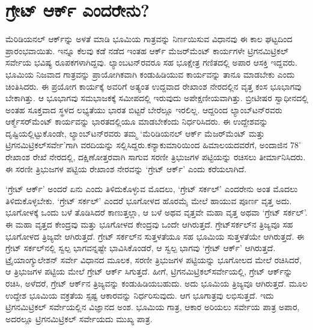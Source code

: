 
\chapter{ಗ್ರೇಟ್​ ಆರ್ಕ್ ಎಂದರೇನು?}

ಮೆರಿಡಿಯನಲ್​ ಆರ್ಕ್‌ನ್ನು ಅಳತೆ ಮಾಡಿ ಭೂಮಿಯ ಗಾತ್ರವನ್ನು ನಿರ್ಣಯಿಸುವ ವಿಧಾನವು ಈ ಕಾಲ ಘಟ್ಟದಿಂದ ಪ್ರಾರಂಭವಾಯಿತು. ಇನ್ನೂ ಕೆಲವು ಕಡೆ ನಡೆದ ಇಂತಹ ಆರ್ಕ್ ಮೆಜರ್​ಮೆಂಟ್​ ಕಾರ್ಯಗಳೇ ಟ್ರಿಗನಮಿಟ್ರಿಕಲ್​ ಸರ್ವೇಯ ಭವಿಷ್ಯ ರೂಪಕಗಳಾಗಿದ್ದವು. ಲ್ಯಾಂಬಟನ್​ರವರೂ ಸಹ ಭೂಕ್ಷೇತ್ರ ಗಣಿತದಲ್ಲಿ ಅಪಾರ ಆಸಕ್ತಿ ಇದ್ದವರು. ಭೂಮಿಯ ನಿಜವಾದ ಗಾತ್ರವನ್ನು ಪ್ರಾಯೋಗಿಕವಾಗಿ ಕಂಡುಹಿಡಿಯುವ ಕಾರ್ಯವನ್ನು ತಾನೂ ಮಾಡಬೇಕು ಎಂದು ಚಿಂತಿಸಿದರು. ಈ ಪ್ರಯೋಗ ಕಾರ್ಯಕ್ಕೆ ಅವರಿಗೆ ಅತ್ಯಂತ ಉದ್ದವಾದ ರೇಖಾಂಶ ನೇರದಲ್ಲಿನ ವೃತ್ತ ಕಂಸ ಭೂಭಾಗವು ಬೇಕಾಗಿತ್ತು. ಆ ಭೂಭಾಗವು ಸಮಭಾಜಕಕ್ಕೆ ಸಮೀಪದಲ್ಲಿ ಇರುವುದು ಅಪೇಕ್ಷಣೀಯವಾಗಿತ್ತು. ಬ್ರೀಟೀಷರ ಸ್ವಾಧೀನದಲ್ಲಿ ಅಂತಹ ಸೂಕ್ತವಾದ ಸ್ಥಳದ ಲಭ್ಯತೆಯು ಭಾರತ ಬಿಟ್ಟರೆ ಬೇರೆಲ್ಲೂ ಇರಲಿಲ್ಲ. ಆದ್ದರಿಂದ ಲ್ಯಾಂಬ್​ಟನ್​ರವರು ಆರ್ಕ್\break ಮೆಸರ್​ಮೆಂಟ್​ ಕಾರ್ಯವನ್ನು ಭಾರತದಲ್ಲಿಯೂ ಮಾಡಬೇಕೆಂದು ನಿರ್ಧರಿಸಿದರು. ಈ ಉದ್ದೇಶವನ್ನು ದೃಷ್ಟಿಯಲ್ಲಿಟ್ಟುಕೊಂಡೇ, ಲ್ಯಾಂಬ್​ಟನ್​ರವರು ತಮ್ಮ ‘ಮೆರಿಡಿಯನಲ್​ ಆರ್ಕ್ ಮೆಜರ್​ಮೆಂಟ್​ ಮತ್ತು ಟ್ರಿಗನಮಿಟ್ರಿಕಲ್​ ಸರ್ವೇ’ಗಾಗಿ ವರದಿಯನ್ನು ಸಲ್ಲಿಸಿದ್ದರು.\break ಕನ್ಯಾಕುಮಾರಿಯಿಂದ ಹಿಮಾಲಯದವರೆಗೆ, ಅಂದಾಜಿನ $78^\circ$ ರೇಖಾಂಶ ರೇಖೆ ನೇರದಲ್ಲಿ, ದಕ್ಷಿಣೋತ್ತರವಾಗಿ ಸಾಗುವ ಸರಣೀ ತ್ರಿಭುಜಗಳ ಪಟ್ಟಿಯನ್ನು ರಚಿಸಲು ತೀರ್ಮಾನಿಸಿದರು. ಈ ಸರಣೀ ತ್ರಿಭುಜಗಳ ಪಟ್ಟಿಯ ರೇಖಾಂಶ ನೇರವನ್ನು ‘ಗ್ರೇಟ್​ ಆರ್ಕ್’ ಎಂದು ಕರೆಯಲಾಗಿದೆ.

`ಗ್ರೇಟ್​ ಆರ್ಕ್’ ಅಂದರೆ ಏನು ಎಂದು ತಿಳಿದುಕೊಳ್ಳುವ ಮೊದಲು, ‘ಗ್ರೇಟ್​ ಸರ್ಕಲ್​’ ಎಂದರೇನು ಅಂತ ಮೊದಲು ತಿಳಿದುಕೊಳ್ಳಬೇಕು. ‘ಗ್ರೇಟ್​ ಸರ್ಕಲ್​’ ಎಂದರೆ ಭೂಗೋಳದ ಹೊರಮೈ ಮೇಲೆ ಹಾಯುವ ಪೂರ್ಣ ವೃತ್ತ ಅದು. ಭೂಗೋಳಕ್ಕೆ ಒಂದು ಬಳೆ ತೊಡಿಸಿದರೆ ಕಾಣುತ್ತಲ್ಲಾ, ಆ ಬಳೆ ಅಥವ ವೃತ್ತವೇ ಮಹಾ ವೃತ್ತ ಅಥವಾ ‘ಗ್ರೇಟ್​ ಸರ್ಕಲ್​’. ಈ ಮಹಾ ವೃತ್ತದ ಕೇಂದ್ರವು ಮತ್ತು ಭೂಗೋಳದ ಕೇಂದ್ರವು ಒಂದೇ ಆಗಿರುತ್ತದೆ. ಗ್ರೇಟ್​ ಸರ್ಕಲ್​ನ ತ್ರಿಜ್ಯವೂ ಸಹ ಭೂಗೋಳದ ತ್ರಿಜ್ಯವೇ ಆಗಿರುತ್ತದೆ. ಗ್ರೇಟ್​ ಸರ್ಕಲ್​ನ ಸುತ್ತಳತೆಯೂ ಸಹ ಭೂಮಿಯ ಸುತ್ತಳತೆಯೇ ಆಗಿರುತ್ತದೆ. ಈ ಗ್ರೇಟ್​ ಸರ್ಕಲ್​ನಲ್ಲಿ ಸ್ವಲ್ಪ ಭಾಗವನ್ನಷ್ಟೇ ಭಾವಿಸಿಕೊಂಡರೆ, ಆ ಸ್ವಲ್ಪ ಭಾಗವು ‘ಗ್ರೇಟ್​ ಆರ್ಕ್’ ಆಗಿರುತ್ತದೆ. ಟ್ರೈಯಾಂಗ್ಯುಲೇಶನ್​ ಸರ್ವೇ ವಿಧಾನದ ಮೂಲಕ, ಸರಣೀ ತ್ರಿಭುಜಗಳ ಪಟ್ಟಿಯನ್ನು ಭೂಗೋಲದ ಮೇಲೆ ರಚಿಸಿದರೆ, ಆ ತ್ರಿಭುಜಗಳ ಪಟ್ಟಿಯ ಮೇಲೆ ಗ್ರೇಟ್​ ಆರ್ಕ್ ಸಿಗುತ್ತದೆ. ಹೀಗೆ, ಟ್ರಿಗನಮಿಟ್ರಿಕಲ್​ ಸರ್ವೇಯಲ್ಲಿ, ಗ್ರೇಟ್​ ಆರ್ಕ್‌ನ್ನು ರಚಿಸಿ, ಅಳೆದರೆ, ಗ್ರೇಟ್​ ಆರ್ಕ್‌ನ ತ್ರಿಜ್ಯವನ್ನು ಕಂಡುಹಿಡಿಯಬಹುದು. ಅದು ಭೂಮಿಯ ತ್ರಿಜ್ಯವೂ ಆಗಿರುತ್ತದೆ. ಮೂಲ ಉದ್ದೇಶ ಭೂಮಿಯ ವಕ್ರತೆಯ ಸ್ಪಷ್ಟ ಆಕಾರವನ್ನು ನಿರ್ಧರಿಸುವುದು. ಆಗ ಭೂಗಾತ್ರವು ಲಭಿಸುತ್ತದೆ. ಇದು ಟ್ರಿಗನಮಿಟ್ರಿಕಲ್​ ಸರ್ವೇಯಲ್ಲಿನ ವಿಜ್ಞಾನದ ಅಂಶ. ಭೂಮಿಯ ಗಾತ್ರ, ಆಕಾರ ಅರಿಯಲು ಸರ್ವೇಯ ಪಾತ್ರ ಅಪಾರ, ಅದರಲ್ಲೂ ಟ್ರಿಗನಮಿಟ್ರಿಕಲ್​ ಸರ್ವೇಯದು ಮುಖ್ಯ ಪಾತ್ರ.

